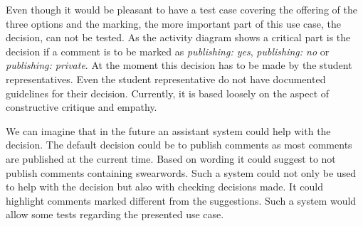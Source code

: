 Even though it would be pleasant to have a test case covering the offering of the three options and the marking, the more important part of this use case, the decision, can not be tested.
As the activity diagram shows a critical part is the decision if a comment is to be marked as \emph{publishing: yes}, \emph{publishing: no} or \emph{publishing: private}.
At the moment this decision has to be made by the student representatives.
Even the student representative do not have documented guidelines for their decision.
Currently, it is based loosely on the aspect of constructive critique and empathy.

We can imagine that in the future an assistant system could help with the decision.
The default decision could be to publish comments as most comments are published at the current time.
Based on wording it could suggest to not publish comments containing swearwords.
Such a system could not only be used to help with the decision but also with checking decisions made.
It could highlight comments marked different from the suggestions.
Such a system would allow some tests regarding the presented use case.
